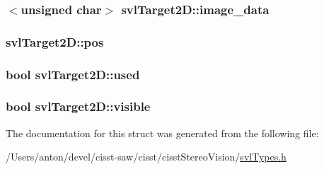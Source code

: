 \subsubsection[{image\+\_\+data}]{$<$unsigned char$>$ svl\+Target2\+D\+::image\+\_\+data}\label{structsvl_target2_d_a26ffc8da663569e7a52982446600a476}
\hypertarget{structsvl_target2_d_ab68be6f073df6ae78c134a2515873b6c}{}
\subsubsection[{pos}]{ svl\+Target2\+D\+::pos}\label{structsvl_target2_d_ab68be6f073df6ae78c134a2515873b6c}
\hypertarget{structsvl_target2_d_a74896ef54f0cdc80faaee2a7321635bc}{}
\subsubsection[{used}]{\setlength{\rightskip}{0pt plus 5cm}bool svl\+Target2\+D\+::used}\label{structsvl_target2_d_a74896ef54f0cdc80faaee2a7321635bc}
\hypertarget{structsvl_target2_d_a90567161b27a6a1c1a8d1bd15c108d63}{}
\subsubsection[{visible}]{\setlength{\rightskip}{0pt plus 5cm}bool svl\+Target2\+D\+::visible}\label{structsvl_target2_d_a90567161b27a6a1c1a8d1bd15c108d63}


The documentation for this struct was generated from the following file\+:\begin{DoxyCompactItemize}
\item 
/\+Users/anton/devel/cisst-\/saw/cisst/cisst\+Stereo\+Vision/\hyperlink{svl_types_8h}{svl\+Types.\+h}\end{DoxyCompactItemize}
